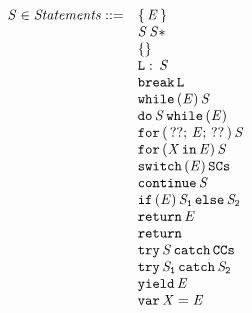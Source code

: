 \documentclass[a4paper,oneside]{article}
\begin{document}
%
\newcommand{\ExpressionStatement}[1]{\{\, #1\, \}}
\newcommand{\Block}[1]{#1\, \statementmeta*}
\newcommand{\EmptyStatement}{\{\}}
%
%
\newcommand{\LabeledStatement}[2]{#1:\, #2}
\newcommand{\BreakStatement}[1]{\tt{break}\, #1}
\newcommand{\WhileStatement}[2]{\tt{while}\, (#1)\, #2}
\newcommand{\DoStatement}[2]{\tt{do}\, #1\, \tt{while}\, (#2)}
\newcommand{\ForStatement}[4]{\tt{for}\, (\,#1;\, #2;\, #3\,)\, #4}
\newcommand{\ForInStatement}[3]{\tt{for}\,(#1\,\tt{in}\,#2)\,#3}
%
\newcommand{\SwitchStatement}[2]{\tt{switch}\,(#1)\,#2}
\newcommand{\ContinueSwitchStatement}[1]{\tt{continue}\,#1}
\newcommand{\IfStatement}[3]{\tt{if}\,(#1)\,#2\,\tt{else}\,#3}
\newcommand{\ReturnStatement}[1]{\tt{return}\,#1}
%
\newcommand{\TryCatch}[2]{\tt{try}\,#1\,\tt{catch}\,#2}
\newcommand{\TryFinally}[2]{\tt{try}\,#1\,\tt{catch}\,#2}
%
\newcommand{\Yield}[1]{\tt{yield}\,#1}
%
\newcommand{\VarDeclaration}[2]{\tt{var}\,#1=#2}
%
%
\[
\begin{array}{rl}

  \statementmeta \in \mathit{Statements} ::=
  & \ExpressionStatement{\expressionmeta} \\
  & \Block{\statementmeta} \\
  & \EmptyStatement \\
  & \LabeledStatement{\labelmeta}{\statementmeta} \\
  & \BreakStatement{\labelmeta} \\
  & \WhileStatement{\expressionmeta}{\statementmeta} \\
  & \DoStatement{\statementmeta}{\expressionmeta} \\
  & \ForStatement{??}{\expressionmeta}{??}{\statementmeta} \\
  & \ForInStatement{\idmeta}{\expressionmeta}{\statementmeta} \\
  & \SwitchStatement{\expressionmeta}{\tt{SCs}} \\
  & \ContinueSwitchStatement{\statementmeta} \\
  & \IfStatement{\expressionmeta}{\statementmeta_1}{\statementmeta_2} \\
  & \ReturnStatement{\expressionmeta} \\
  & \ReturnStatement{} \\
  & \TryCatch{\statementmeta}{\tt{CCs}} \\
  & \TryFinally{\statementmeta_1}{\statementmeta_2} \\
  & \Yield{\expressionmeta} \\
  & \VarDeclaration{\idmeta}{\expressionmeta} \\

\end{array}
\]
\end{document}
